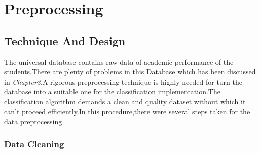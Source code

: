  
\chapter{Preprocessing} %

\label{Preprocessing} %




\section{Technique And Design}
The universal database contains raw data of academic performance of the students.There are plenty of problems in this Database which has been discussed in \textit{Chapter3}.A rigorous preprocessing technique is highly needed for turn the database into a suitable one for the classification implementation.The classification algorithm demands a clean and quality dataset without which it can't proceed efficiently.In this procedure,there were several steps taken for the data preprocessing. 
\subsection{Data Cleaning}

